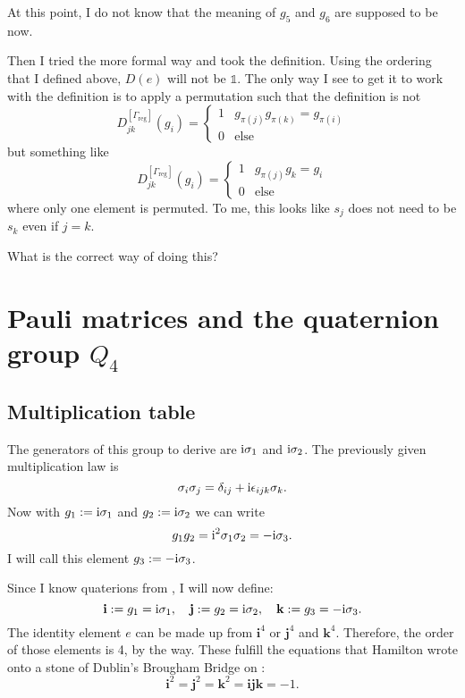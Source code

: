 \documentclass[11pt, english, fleqn, DIV=15, headinclude, BCOR=1cm]{scrartcl}
\begin{document}
\begin{question}
    At this point, I do not know that the meaning of $g_5$ and $g_6$ are
    supposed to be now.

    Then I tried the more formal way and took the definition. Using the
    ordering that I defined above, $D(e)$ will not be $\mathbb 1$. The only way
    I see to get it to work with the definition is to apply a permutation such
    that the definition is not
    \[
        D_{jk}^{[\Gamma_\text{reg}]} (g_i) =
        \begin{cases}
            1 & g_{\pi(j)} g_{\pi(k)} = g_{\pi(i)} \\
            0 & \text{else}
        \end{cases}
    \]
    but something like
    \[
        D_{jk}^{[\Gamma_\text{reg}]} (g_i) =
        \begin{cases}
            1 & g_{\pi(j)} g_{k} = g_{i} \\
            0 & \text{else}
        \end{cases}
    \]
    where only one element is permuted. To me, this looks like $s_j$ does not
    need to be $s_k$ even if $j = k$.

    What is the correct way of doing this?
\end{question}

\section{Pauli matrices and the quaternion group $Q_4$}

\newcommand\1{\sigma_1}
\newcommand\2{\sigma_2}
\newcommand\3{\sigma_3}

\subsection{Multiplication table}

The generators of this group to derive are $\iup\1$ and $\iup\2$. The
previously given multiplication law is
\[
    \sigma_i\sigma_j = \delta_{ij} + \mathrm i \epsilon_{ijk} \sigma_k.
\]
Now with $g_1 := \iup\1$ and $g_2 := \iup\2$ we can write
\[
    g_1 g_2 = \iup^2 \1\2 = - \iup \sigma_3.
\]
I will call this element $g_3 := - \mathrm i \sigma_3$.

\newcommand\qi{\mathbf i}
\newcommand\qj{\mathbf j}
\newcommand\qk{\mathbf k}

Since I know quaterions from \parencite[§11.1]{penrose-road_to_reality}, I will
now define:
\[
    \qi := g_1 = \iup\1
    \eqnsep
    \qj := g_2 = \iup\2
    \eqnsep
    \qk := g_3 = -\iup\3.
\]
The identity element $e$ can be made up from $\qi^4$ or $\qj^4$ and $\qk^4$.
Therefore, the order of those elements is 4, by the way. These fulfill the
equations that Hamilton wrote onto a stone of Dublin's Brougham Bridge on
 \parencite[198]{penrose-road_to_reality}:
\[
    \qi^2 = \qj^2 = \qk^2 = \qi\qj\qk = -1.
\]
\end{document}

